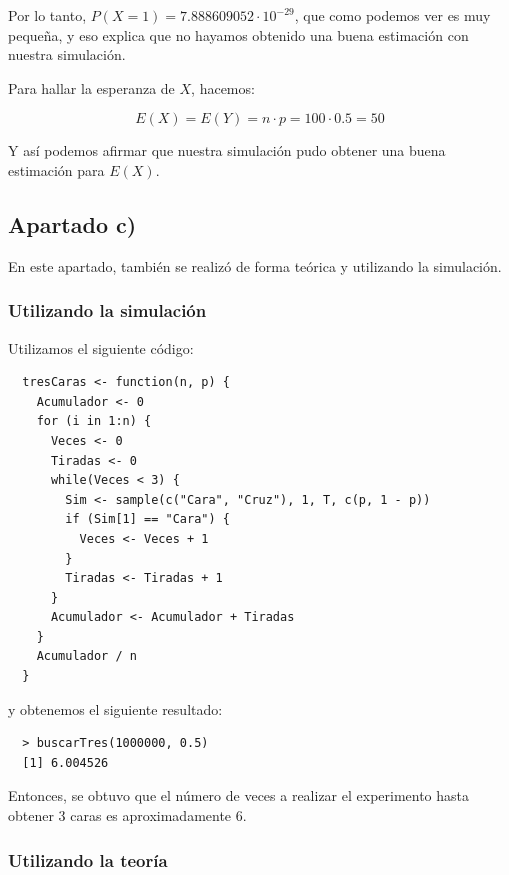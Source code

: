 \documentclass[11pt]{article}
\begin{document}
Por lo tanto, $ P(X = 1) =  7.888609052 \cdot 10^{-29}$, que como podemos ver
es muy pequeña, y eso explica que no hayamos obtenido una buena estimación con
nuestra simulación.

Para hallar la esperanza de $ X $, hacemos:

\begin{equation*}
    E(X) = E(Y) = n \cdot p = 100 \cdot 0.5 = 50
\end{equation*}

Y así podemos afirmar que nuestra simulación pudo obtener una buena estimación
para $ E(X) $.


\subsection*{Apartado c)}

En este apartado, también se realizó de forma teórica y utilizando la simulación.

\subsubsection*{Utilizando la simulación}

Utilizamos el siguiente código:

\begin{verbatim}
  tresCaras <- function(n, p) {
    Acumulador <- 0
    for (i in 1:n) {
      Veces <- 0
      Tiradas <- 0
      while(Veces < 3) {
        Sim <- sample(c("Cara", "Cruz"), 1, T, c(p, 1 - p))
        if (Sim[1] == "Cara") {
          Veces <- Veces + 1
        }
        Tiradas <- Tiradas + 1
      }
      Acumulador <- Acumulador + Tiradas
    }
    Acumulador / n
  }
\end{verbatim}

y obtenemos el siguiente resultado:

\begin{verbatim}
  > buscarTres(1000000, 0.5)
  [1] 6.004526
\end{verbatim}

Entonces, se obtuvo que el número de veces a realizar el experimento hasta
obtener 3 caras es aproximadamente 6.

\subsubsection*{Utilizando la teoría}
\end{document}
